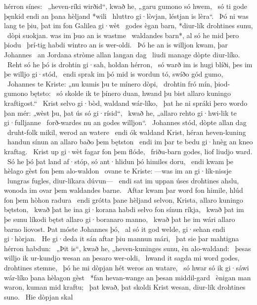 hérron sínes: \hld\ „heven-ríki wirðid“, kwað he,
„garu gumono só hwem, \hld\ só ti gode þęnkid
endi an þana hèljand *wili \hld\ hluttro gi·lòvjan, %
léstjan is lèra“. \hld\ Þó ni was lang te þiu,
þat im fon Galilea gi·wèt \hld\ godes ègan barn,
*diur-lík drohtines sunu, \hld\ dòpi suokjan.
was im þuo an is wastme \hld\ waldandes barn*,
al só he mid þero þiodu \hld\ þrí-tig habdi
wintro an is wer-oldi. \hld\ Þó he an is willjon kwam,
þar Johannes \hld\ an Jordana stròme
allan langan dag \hld\ liudi manage
dòpte diur-líko. \hld\ Reht só he þó is drohtin gi·sah,
holdan hérron, \hld\ só warð im is hugi blíði,
þes im þe willjo gi·stód, \hld\ endi sprak im þó mid is wordun tó,
swíðo gód gumo, \hld\ Johannes te Kriste:
„nu kumis þu te mínero dòpi, \hld\ drohtin fró mín,
þiod-gumono bętsto: \hld\ só skolde ik te þínero duan,
hwand þu bist allaro kuningo kraftigost.“ \hld\ Krist selvo gi·bòd,
waldand wár-líko, \hld\ þat he ni spráki þero wordo þan mér:
„wèst þu, þat ús só gi·rísid“, \hld\ kwað he, „allaro rehto gi·hwi-lik
te gi·fulljanne \hld\ forð-wardes nu
an godes willjon“. \hld\ Johannes stód,
dòpte allan dag \hld\ druht-folk mikil,
werod an watere \hld\ endi ók waldand Krist,
héran heven-kuning \hld\ handun sínun
an allaro baðo þem bętston \hld\ endi im þar te bedu gi·hnèg
an kneo kraftag. \hld\ Krist up gi·wèt
fagar fon þem flóde, \hld\ friðu-barn godes,
liof liudjo ward. \hld\ Só he þó þat land af·stóp,
só ant·hlidun þó himiles doru, \hld\ endi kwam þe hèlago gèst
fon þem alo-waldon \hld\ ovane te Kriste:
—was im an gi·lík-nissje \hld\ lungras fugles,
diur-líkara dúvun— \hld\ endi sat im uppan úses drohtines ahslu,
wonoda im ovar þem waldandes barne. \hld\ Aftar kwam þar word fon himile,
hlúd fon þem hòhon radura \hld\ endi grótta þane hèljand selvon,
Krista, allaro kuningo bętston, \hld\ kwað þat he ina gi·korana habdi
selvo fon sínun ríkja, \hld\ kwað þat im þe sunu líkodi
bętst allaro gi·boranaro manno, \hld\ kwað þat he im wári allaro barno liovost.
Þat móste Johannes þó, \hld\ al só it god welde,
gi·sehan endi gi·hòrjan. \hld\ He gi·deda it sán aftar þiu
mannun mári, \hld\ þat sie þar mahtigna
hérron habdun: \hld\ „Þit is“, kwað he, „heven-kuninges sunu,
èn alo-waldand: \hld\ þesas willjo ik ur-kundjo
wesan an þesaro wer-oldi, \hld\ hwand it sagda mi word godes,
drohtines stemne, \hld\ þó he mi dòpjan hét
weros an watare, \hld\ só hwar só ik gi·sáwi wár-líko
þana hèlagon gèst \hld\ *fan hevan-wange
an þesan middil-gard \hld\ ènigan man waron,
kuman mid kraftu; \hld\ þat kwað, þat skoldi Krist wesan,
diur-lík drohtines suno. \hld\ Hie dòpjan skal
